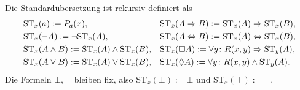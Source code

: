 Die Standardübersetzung ist rekursiv definiert als
\begin{align*}
&\mathrm{ST}_x(a) := P_a(x),
&& \mathrm{ST}_x(A\Rightarrow B) := \mathrm{ST}_x(A)\Rightarrow\mathrm{ST}_x(B),\\
&\mathrm{ST}_x(\lnot A) := \lnot\mathrm{ST}_x(A),
&& \mathrm{ST}_x(A\Leftrightarrow B) := \mathrm{ST}_x(A)\Leftrightarrow\mathrm{ST}_x(B),\\
&\mathrm{ST}_x(A\land B) := \mathrm{ST}_x(A)\land\mathrm{ST}_x(B),
&& \mathrm{ST}_x(\Box A) := \forall y\colon R(x,y)\Rightarrow\mathrm{ST}_y(A),\\
& \mathrm{ST}_x(A\lor B) := \mathrm{ST}_x(A)\lor\mathrm{ST}_x(B),
&& \mathrm{ST}_x(\Diamond A) := \forall y\colon R(x,y)\land\mathrm{ST}_y(A).
\end{align*}
Die Formeln $\bot,\top$ bleiben fix, also
$\mathrm{ST}_x(\bot) := \bot$ und $\mathrm{ST}_x(\top) := \top$.

